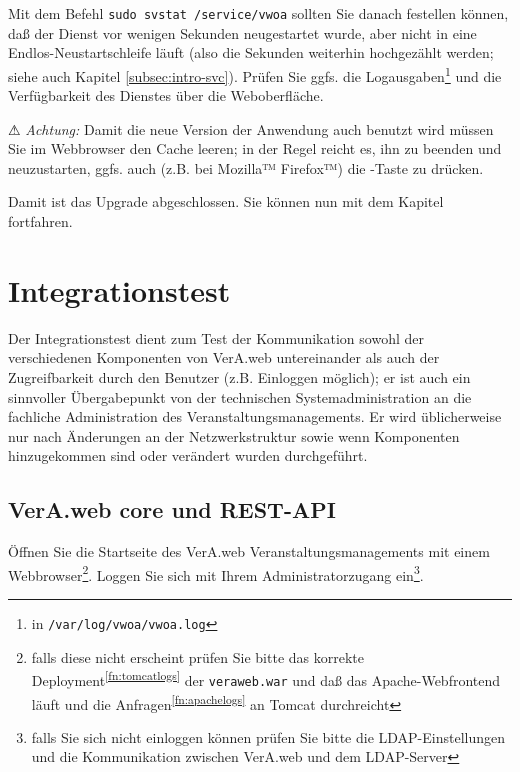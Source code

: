 Mit dem Befehl \texttt{sudo svstat /service/vwoa} sollten Sie
danach festellen können, daß der Dienst vor wenigen Sekunden
neugestartet wurde, aber nicht in eine Endlos-Neustartschleife
läuft (also die Sekunden weiterhin hochgezählt werden; siehe
auch Kapitel \ref{subsec:intro-svc}). Prüfen Sie ggfs. die
Logausgaben\Hair\footnote{\label{fn:vwoalogs}in
\texttt{/var/log/vwoa/vwoa.log}} und die Verfügbarkeit des
Dienstes über die Weboberfläche.

⚠ \emph{Achtung:} Damit die neue Version der Anwendung auch
benutzt wird müssen Sie im Webbrowser den Cache leeren; in
der Regel reicht es, ihn zu beenden und neuzustarten, ggfs.
auch (z.B. bei Mozilla™ Firefox™) die -Taste
zu drücken.

\fi%

Damit ist das Upgrade abgeschlossen.
Sie können nun mit dem Kapitel  fortfahren.

\section{Integrationstest}\label{sec:test}

Der Integrationstest dient zum Test der Kommunikation sowohl der
verschiedenen Komponenten von VerA.web untereinander als auch der
Zugreifbarkeit durch den Benutzer (z.B. Einloggen möglich); er ist auch
ein sinnvoller Übergabepunkt von der technischen Systemadministration
an die fachliche Administration des Veranstaltungsmanagements. Er wird
üblicherweise nur nach Änderungen an der Netzwerkstruktur sowie wenn
Komponenten hinzugekommen sind oder verändert wurden durchgeführt.

\ifoa
\subsection{VerA.web core und REST-API}
\fi%

Öffnen Sie die Startseite des VerA.web Veranstaltungsmanagements mit
einem Webbrowser\Hair\footnote{falls diese nicht erscheint prüfen Sie
bitte das korrekte Deployment\Hair\textsuperscript{\ref{fn:tomcatlogs}}
der \texttt{veraweb.war} und daß das Apache-Webfrontend läuft und die
Anfragen\Hair\textsuperscript{\ref{fn:apachelogs}} an Tomcat durchreicht}.
Loggen Sie sich mit Ihrem Administratorzugang ein\Hair\footnote{falls
Sie sich nicht einloggen können prüfen Sie bitte die LDAP-Einstellungen
und die Kommunikation zwischen VerA.web und dem LDAP-Server}.

%

